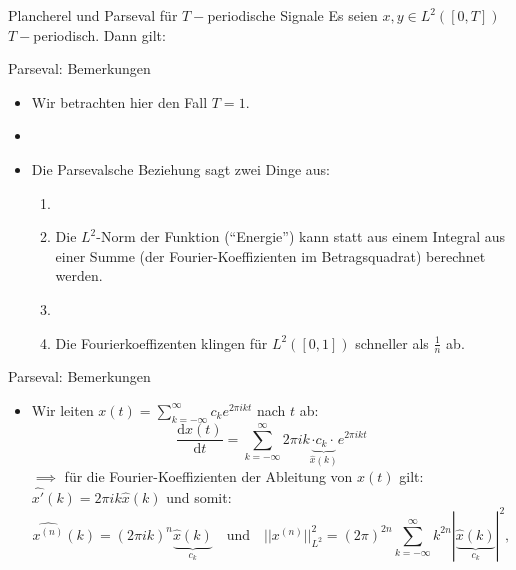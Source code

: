 \documentclass[14pt, aspectratio=169, handout]{beamer}
\begin{document}
\begin{frame}{Plancherel und Parseval für $T-$periodische Signale}
    Es seien $x,y \in L^2([0,T])$ $T-$periodisch. Dann gilt:
    \vspace*{0.25cm}
\end{frame}

\begin{frame}{Parseval: Bemerkungen}
    \begin{itemize}
        \item Wir betrachten hier den Fall $T=1$. 
        \item[] 
        \item Die Parsevalsche Beziehung sagt zwei Dinge aus: \begin{enumerate}
            \item[] 
            \item Die $L^2$-Norm der Funktion (“Energie”) kann statt aus einem Integral aus einer Summe (der Fourier-Koeffizienten im Betragsquadrat) berechnet werden.
            \item[] 
            \item Die Fourierkoeffizenten klingen für $L^2([0,1])$ schneller als $\frac{1}{n}$ ab.
        \end{enumerate} 
    \end{itemize}
\end{frame}

\begin{frame}{Parseval: Bemerkungen}
    \begin{itemize}
        \item Wir leiten $x(t) = \displaystyle\sum_{k = -\infty}^\infty c_k e^{2 \pi i k t}$ nach $t$ ab:
        $$\frac{\text{d}x(t)}{\text{d}t} = \sum_{k=-\infty}^{\infty} 2 \pi i k \underbrace{\cdot c_k \cdot}_{\hat{x}(k)} e^{2 \pi i k t}$$
        $ \implies$ für die Fourier-Koeffizienten der Ableitung von $x(t)$ gilt: $\hat{x'}(k) = 2 \pi i k \hat{x}(k)$ und somit:
        $$\widehat{x^{(n)}}(k) = (2 \pi i k)^n \underbrace{\hat{x}(k)}_{c_k} \hspace{12pt} \text{und} \hspace{12pt} ||x^{(n)}||^2_{L^2} = (2 \pi)^{2n} \sum_{k = -\infty}^\infty k^{2n}|\underbrace{\hat{x}(k)}_{c_k}|^2,$$
    \end{itemize}
\end{frame}
\end{document}
